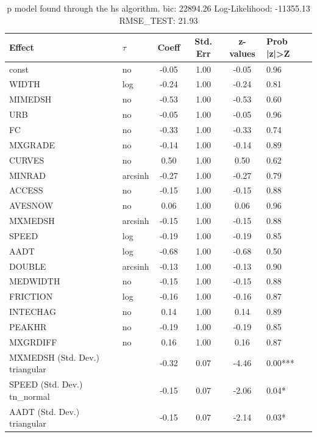 \begin{table}
	\caption{p model found through the hs algorithm. bic: 22894.26 Log-Likelihood: -11355.13 RMSE_TEST: 21.93}
	\begin{center}
		\begin{tabular}{|l|l|c|c|c|l|}
			\hline
			Effect & $\tau$ & Coeff & Std. Err & z-values & Prob |z|>Z \\
			\hline
			const & no & -0.05 & 1.00 & -0.05 & 0.96 \\
			\hline
			WIDTH & log & -0.24 & 1.00 & -0.24 & 0.81 \\
			\hline
			MIMEDSH & no & -0.53 & 1.00 & -0.53 & 0.60 \\
			\hline
			URB & no & -0.05 & 1.00 & -0.05 & 0.96 \\
			\hline
			FC & no & -0.33 & 1.00 & -0.33 & 0.74 \\
			\hline
			MXGRADE & no & -0.14 & 1.00 & -0.14 & 0.89 \\
			\hline
			CURVES & no & 0.50 & 1.00 & 0.50 & 0.62 \\
			\hline
			MINRAD & arcsinh & -0.27 & 1.00 & -0.27 & 0.79 \\
			\hline
			ACCESS & no & -0.15 & 1.00 & -0.15 & 0.88 \\
			\hline
			AVESNOW & no & 0.06 & 1.00 & 0.06 & 0.96 \\
			\hline
			MXMEDSH & arcsinh & -0.15 & 1.00 & -0.15 & 0.88 \\
			\hline
			SPEED & log & -0.19 & 1.00 & -0.19 & 0.85 \\
			\hline
			AADT & log & -0.68 & 1.00 & -0.68 & 0.50 \\
			\hline
			DOUBLE & arcsinh & -0.13 & 1.00 & -0.13 & 0.90 \\
			\hline
			MEDWIDTH & no & -0.15 & 1.00 & -0.15 & 0.88 \\
			\hline
			FRICTION & log & -0.16 & 1.00 & -0.16 & 0.87 \\
			\hline
			INTECHAG & no & 0.14 & 1.00 & 0.14 & 0.89 \\
			\hline
			PEAKHR & no & -0.19 & 1.00 & -0.19 & 0.85 \\
			\hline
			MXGRDIFF & no & 0.16 & 1.00 & 0.16 & 0.87 \\
			\hline
			MXMEDSH (Std. Dev.) triangular &  & -0.32 & 0.07 & -4.46 & 0.00*** \\
			\hline
			SPEED (Std. Dev.) tn_normal &  & -0.15 & 0.07 & -2.06 & 0.04* \\
			\hline
			AADT (Std. Dev.) triangular &  & -0.15 & 0.07 & -2.14 & 0.03* \\

\end{tabular}
\end{center}
\end{table}
